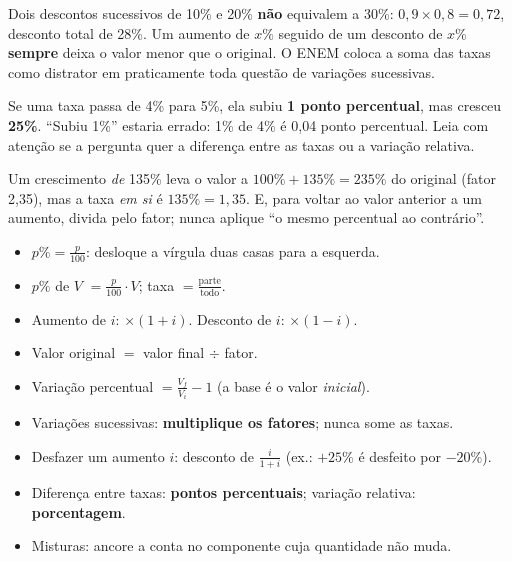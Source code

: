 \begin{atencao}
Dois descontos sucessivos de 10\% e 20\% \textbf{não} equivalem a 30\%:
$0{,}9\times 0{,}8 = 0{,}72$, desconto total de 28\%. Um aumento de $x\%$ seguido de
um desconto de $x\%$ \textbf{sempre} deixa o valor menor que o original. O
ENEM coloca a soma das taxas como distrator em praticamente toda questão de
variações sucessivas.
\end{atencao}

\begin{atencao}
Se uma taxa passa de 4\% para 5\%, ela subiu \textbf{1 ponto percentual}, mas
cresceu \textbf{25\%}. ``Subiu 1\%'' estaria errado: 1\% de 4\% é 0,04 ponto
percentual. Leia com atenção se a pergunta quer a diferença entre as taxas ou a
variação relativa.
\end{atencao}

\begin{atencao}
Um crescimento \emph{de} 135\% leva o valor a $100\% + 135\% = 235\%$ do original
(fator 2,35), mas a taxa \emph{em si} é $135\% = 1{,}35$. E, para voltar ao
valor anterior a um aumento, divida pelo fator; nunca aplique ``o mesmo
percentual ao contrário''.
\end{atencao}

\begin{resumo}
\begin{itemize}[leftmargin=1.3em,itemsep=2pt]
  \item $p\% = \frac{p}{100}$: desloque a vírgula duas casas para a esquerda.
  \item $p\%$ de $V$ $= \frac{p}{100}\cdot V$; \quad taxa $=\frac{\text{parte}}{\text{todo}}$.
  \item Aumento de $i$: $\times(1+i)$. \quad Desconto de $i$: $\times(1-i)$.
  \item Valor original $=$ valor final $\div$ fator.
  \item Variação percentual $=\frac{V_f}{V_i}-1$ (a base é o valor \emph{inicial}).
  \item Variações sucessivas: \textbf{multiplique os fatores}; nunca some as taxas.
  \item Desfazer um aumento $i$: desconto de $\frac{i}{1+i}$ (ex.: $+25\%$ é desfeito por $-20\%$).
  \item Diferença entre taxas: \textbf{pontos percentuais}; variação relativa: \textbf{porcentagem}.
  \item Misturas: ancore a conta no componente cuja quantidade não muda.
\end{itemize}
\end{resumo}

